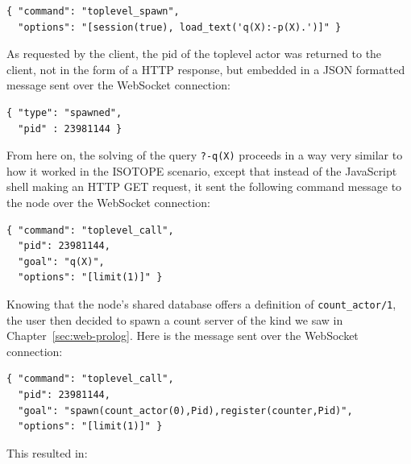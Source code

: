 \begin{verbatim}
{ "command": "toplevel_spawn",
  "options": "[session(true), load_text('q(X):-p(X).')]" }
\end{verbatim}

\noindent As requested by the client, the pid of the toplevel actor was returned to the client, not in the form of a HTTP response, but embedded in a JSON formatted message sent over the WebSocket connection:

\begin{verbatim}
{ "type": "spawned",
  "pid" : 23981144 }
\end{verbatim}

\noindent From here on, the solving of the query \texttt{?-q(X)} proceeds in a way very similar to how it worked in the ISOTOPE scenario, except that instead of the JavaScript shell making an HTTP GET request, it sent the following command message to the node over the WebSocket connection:

\begin{verbatim}
{ "command": "toplevel_call",
  "pid": 23981144,
  "goal": "q(X)",
  "options": "[limit(1)]" }
\end{verbatim}

%
%

\noindent Knowing that the node's shared database offers a definition of \texttt{count\_actor/1}, the user then decided to spawn a count server of the kind we saw in Chapter~\ref{sec:web-prolog}. Here is the message sent over the WebSocket connection:

\begin{verbatim}
{ "command": "toplevel_call",
  "pid": 23981144,
  "goal": "spawn(count_actor(0),Pid),register(counter,Pid)",
  "options": "[limit(1)]" }
\end{verbatim}

\noindent This resulted in:

